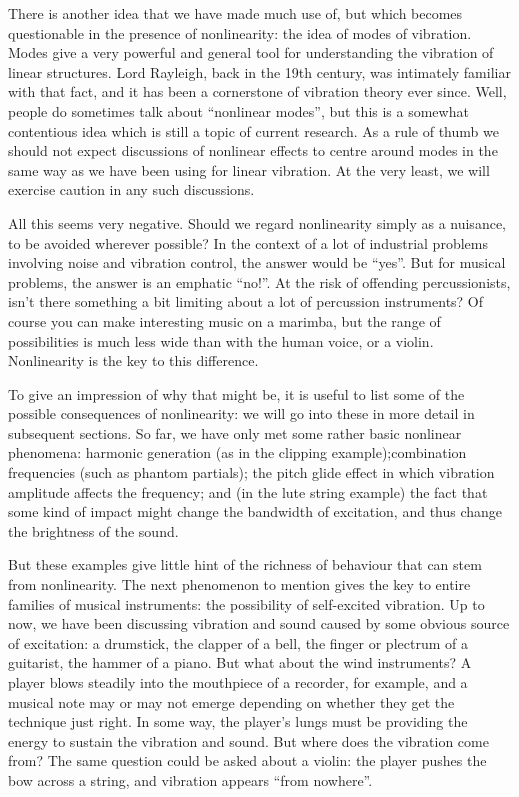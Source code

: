   There is another idea that we have made much use of, but which becomes 
  questionable in the presence of nonlinearity: the idea of modes of vibration. 
  Modes give a very powerful and general tool for understanding the vibration 
  of linear structures. Lord Rayleigh, back in the 19th century, was intimately 
  familiar with that fact, and it has been a cornerstone of vibration theory 
  ever since. Well, people do sometimes talk about “nonlinear modes”, but this 
  is a somewhat contentious idea which is still a topic of current research. As 
  a rule of thumb we should not expect discussions of nonlinear effects to 
  centre around modes in the same way as we have been using for linear 
  vibration. At the very least, we will exercise caution in any such 
  discussions. 

  All this seems very negative. Should we regard nonlinearity simply as a 
  nuisance, to be avoided wherever possible? In the context of a lot of 
  industrial problems involving noise and vibration control, the answer would 
  be “yes”. But for musical problems, the answer is an emphatic “no!”. At the 
  risk of offending percussionists, isn’t there something a bit limiting about 
  a lot of percussion instruments? Of course you can make interesting music on 
  a marimba, but the range of possibilities is much less wide than with the 
  human voice, or a violin. Nonlinearity is the key to this difference. 

  To give an impression of why that might be, it is useful to list some of the 
  possible consequences of nonlinearity: we will go into these in more detail 
  in subsequent sections. So far, we have only met some rather basic nonlinear 
  phenomena: harmonic generation (as in the clipping example);combination 
  frequencies (such as phantom partials); the pitch glide effect in which 
  vibration amplitude affects the frequency; and (in the lute string example) 
  the fact that some kind of impact might change the bandwidth of excitation, 
  and thus change the brightness of the sound. 

  But these examples give little hint of the richness of behaviour that can 
  stem from nonlinearity. The next phenomenon to mention gives the key to 
  entire families of musical instruments: the possibility of self-excited 
  vibration. Up to now, we have been discussing vibration and sound caused by 
  some obvious source of excitation: a drumstick, the clapper of a bell, the 
  finger or plectrum of a guitarist, the hammer of a piano. But what about the 
  wind instruments? A player blows steadily into the mouthpiece of a recorder, 
  for example, and a musical note may or may not emerge depending on whether 
  they get the technique just right. In some way, the player’s lungs must be 
  providing the energy to sustain the vibration and sound. But where does the 
  vibration come from? The same question could be asked about a violin: the 
  player pushes the bow across a string, and vibration appears “from nowhere”. 

